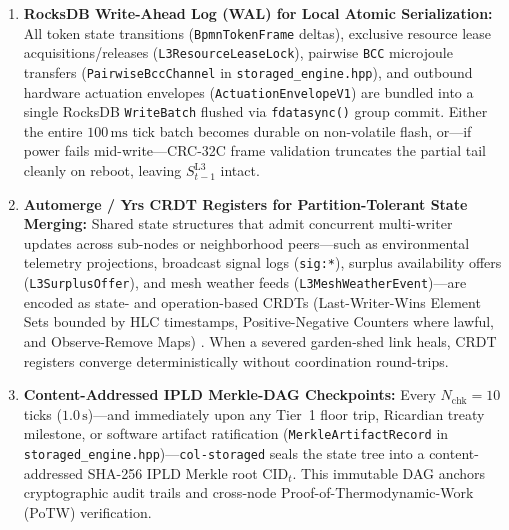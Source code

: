 \begin{enumerate}
\item \textbf{RocksDB Write-Ahead Log (WAL) for Local Atomic Serialization:} All token state
        transitions (\texttt{BpmnTokenFrame} deltas), exclusive resource lease
        acquisitions/releases (\texttt{L3ResourceLeaseLock}), pairwise \texttt{BCC}
        microjoule transfers (\texttt{PairwiseBccChannel} in \texttt{storaged\_engine.hpp}),
        and outbound hardware actuation envelopes (\texttt{ActuationEnvelopeV1}) are bundled
        into a single RocksDB \texttt{WriteBatch} flushed via \texttt{fdatasync()} group
        commit. Either the entire $100\,\mathrm{ms}$ tick batch becomes durable on
        non-volatile flash, or---if power fails mid-write---CRC-32C frame validation
        truncates the partial tail cleanly on reboot, leaving $S_{t-1}^{\mathrm{L3}}$
        intact.
\item \textbf{Automerge / Yrs CRDT Registers for Partition-Tolerant State Merging:} Shared
        state structures that admit concurrent multi-writer updates across sub-nodes or
        neighborhood peers---such as environmental telemetry projections, broadcast signal
        logs (\texttt{sig:*}), surplus availability offers (\texttt{L3SurplusOffer}), and
        mesh weather feeds (\texttt{L3MeshWeatherEvent})---are encoded as state- and
        operation-based CRDTs (Last-Writer-Wins Element Sets bounded by HLC timestamps,
        Positive-Negative Counters where lawful, and Observe-Remove Maps)
        \parencite{shapiro2011crdt}. When a severed garden-shed link heals, CRDT registers
        converge deterministically without coordination round-trips.
\item \textbf{Content-Addressed IPLD Merkle-DAG Checkpoints:} Every $N_{\mathrm{chk}} = 10$
        ticks ($1.0\,\mathrm{s}$)---and immediately upon any Tier~1 floor trip, Ricardian
        treaty milestone, or software artifact ratification (\texttt{MerkleArtifactRecord}
        in \texttt{storaged\_engine.hpp})---\texttt{col-storaged} seals the state tree into
        a content-addressed SHA-256 IPLD Merkle root $\mathrm{CID}_t$. This immutable DAG
        anchors cryptographic audit trails and cross-node Proof-of-Thermodynamic-Work (PoTW)
        verification.
\end{enumerate}

